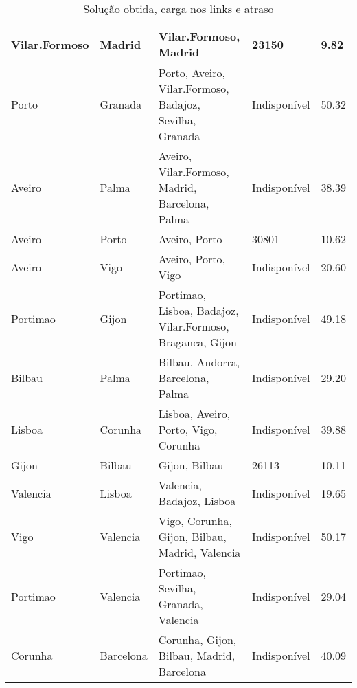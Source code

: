 \begin{table}[!htb]
{\begin{tabular}{|l|l|l|l|l|}
Vilar.Formoso & Madrid & Vilar.Formoso, Madrid & 23150 & 9.82 \\ \hline
Porto & Granada & Porto, Aveiro, Vilar.Formoso, Badajoz, Sevilha, Granada & Indisponível & 50.32 \\ \hline
Aveiro & Palma & Aveiro, Vilar.Formoso, Madrid, Barcelona, Palma & Indisponível & 38.39 \\ \hline
Aveiro & Porto & Aveiro, Porto & 30801 & 10.62 \\ \hline
Aveiro & Vigo & Aveiro, Porto, Vigo & Indisponível & 20.60 \\ \hline
Portimao & Gijon & Portimao, Lisboa, Badajoz, Vilar.Formoso, Braganca, Gijon & Indisponível & 49.18 \\ \hline
Bilbau & Palma & Bilbau, Andorra, Barcelona, Palma & Indisponível & 29.20 \\ \hline
Lisboa & Corunha & Lisboa, Aveiro, Porto, Vigo, Corunha & Indisponível & 39.88 \\ \hline
Gijon & Bilbau & Gijon, Bilbau & 26113 & 10.11 \\ \hline
Valencia & Lisboa & Valencia, Badajoz, Lisboa & Indisponível & 19.65 \\ \hline
Vigo & Valencia & Vigo, Corunha, Gijon, Bilbau, Madrid, Valencia & Indisponível & 50.17 \\ \hline
Portimao & Valencia & Portimao, Sevilha, Granada, Valencia & Indisponível & 29.04 \\ \hline
Corunha & Barcelona & Corunha, Gijon, Bilbau, Madrid, Barcelona & Indisponível & 40.09 \\ \hline
\end{tabular}}
\caption[]{Solução obtida, carga nos links e atraso}
\end{table}


